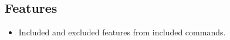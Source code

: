\subsection{Features}\label{Features}

\begin{itemize}
    \item Included and excluded features from included commands.
\end{itemize}